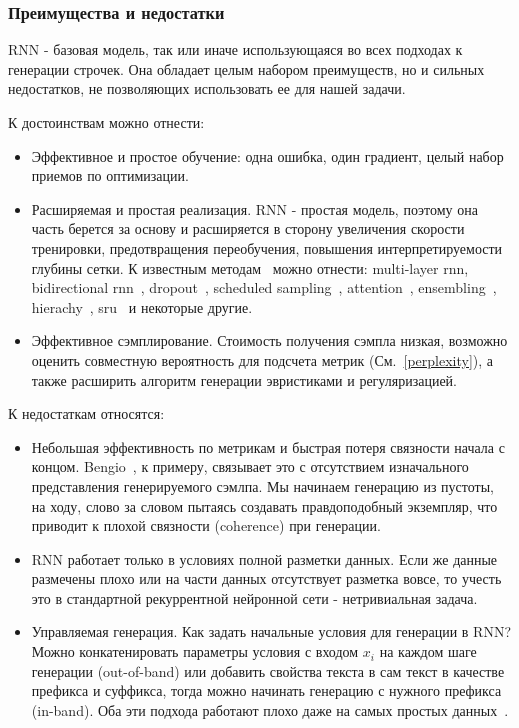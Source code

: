 \documentclass{spbau-diploma}
\begin{document}
\subsubsection{Преимущества и недостатки}
RNN - базовая модель, так или иначе использующаяся во всех подходах к генерации
строчек. Она обладает целым набором преимуществ, но и сильных недостатков, не
позволяющих использовать ее для нашей задачи.

К достоинствам можно отнести:
\begin{itemize}
    \item Эффективное и простое обучение: одна ошибка, один градиент, целый 
    набор приемов по оптимизации.
    \item Расширяемая и простая реализация. RNN - простая модель, поэтому она
    часть берется за основу и расширяется в сторону увеличения скорости 
    тренировки, предотвращения переобучения, повышения интерпретируемости 
    глубины сетки. К известным методам~\cite{bengio_rnn} можно отнести: 
    multi-layer rnn, bidirectional rnn~\cite{bidir_rnn}, 
    dropout~\cite{wiki:dropout}, scheduled sampling~\cite{1506.03099},
    attention~\cite{attention_rnn}, ensembling~\cite{wiki:ensebling},
    hierachy~\cite{1609.01704}, sru~\cite{1709.02755} и некоторые другие.
    \item Эффективное сэмплирование. Стоимость получения сэмпла низкая, возможно
    оценить совместную вероятность для подсчета метрик (См.~\ref{perplexity}),
    а также расширить алгоритм генерации эвристиками и регуляризацией.
\end{itemize}

К недостаткам относятся:
\begin{itemize}
    \item Небольшая эффективность по метрикам и быстрая потеря связности 
    начала с концом. Bengio~\cite{bengio_rnn}, к примеру, связывает это с 
    отсутствием изначального представления генерируемого сэмлпа. Мы 
    начинаем генерацию из пустоты, на ходу, слово за словом пытаясь создавать
    правдоподобный экземпляр, что приводит к плохой связности (coherence) при
    генерации.
    \item RNN работает только в условиях полной разметки данных. Если же данные
    размечены плохо или на части данных отсутствует разметка вовсе, то учесть
    это в стандартной рекуррентной нейронной сети - нетривиальная задача.
    \item Управляемая генерация. Как задать начальные условия для генерации в 
    RNN? Можно конкатенировать параметры условия с входом 
    $x_i$ на каждом шаге генерации (out-of-band) или добавить свойства текста
    в сам текст в качестве префикса и суффикса, тогда можно начинать генерацию
    с нужного префикса (in-band). Оба эти подхода работают плохо даже на самых
    простых данных~\cite{rnn_meta}.
\end{itemize}
\end{document}
